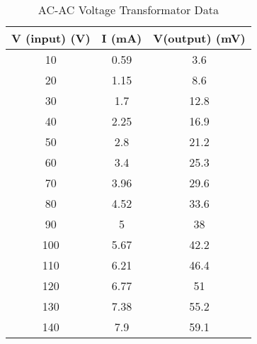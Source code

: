 \begin{minipage}{\linewidth}
\begin{table}[H]
    \centering
    \caption{AC-AC Voltage Transformator Data }
    \label{tab:voltage transformator }
    \small
    \begin{tabular*}{\linewidth}{@{\extracolsep{\fill}}ccc}
    \textbf{V (input) (V)} &\textbf{I (mA)} &\textbf{V(output) (mV)} \\\midrule
    10 &0.59 &3.6 \\
    20 &1.15 &8.6 \\
    30 &1.7 &12.8 \\
    40 &2.25 &16.9 \\
    50 &2.8 &21.2 \\
    60 &3.4 &25.3 \\
    70 &3.96 &29.6 \\
    80 &4.52 &33.6 \\
    90 &5 &38 \\
    100 &5.67 &42.2 \\
    110 &6.21 &46.4 \\
    120 &6.77 &51 \\
    130 &7.38 &55.2 \\
    140 &7.9 &59.1 \\
    \bottomrule
    \end{tabular*}
\end{table}
\vspace{1cm}
\end{minipage}

